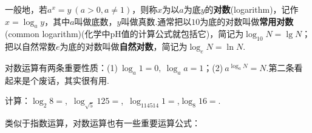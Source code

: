 \documentclass[lang=cn, zihao=4.5]{elegantbook}
\newcommand{\tk}{\uline{\hspace{4em}}}
\begin{document}
一般地，若$a^x=y~(a>0,a \neq 1)$，则称$x$为以$a$为底$y$的\textbf{对数}(logarithm)，记作$x = \log_{a}{y}$，其中$a$叫做底数，$y$叫做真数.通常把以$10$为底的对数叫做\textbf{常用对数}(common logarithm)(化学中pH值的计算公式就包括它)，简记为$\log_{10}{N}=\lg N$；把以自然常数$e$为底的对数叫做\textbf{自然对数}，简记为$\log_{e}{N}=\ln N$.

对数运算有两条重要性质：(1)$~\log_{a}{1} = 0,~\log_{a}{a}=1$；(2)$~a^{\log_{a}{N}}=N$.第二条看起来是个废话，其实很有用.

\begin{example}
	计算：$\log_{2}{8}=$\tk ,~$\log_{\sqrt{5}}{125}=$\tk ,~$\log_{114514}{1}=$\tk ,$\log_{8}{16}=$\tk .
\end{example}

类似于指数运算，对数运算也有一些重要运算公式：
\end{document}
